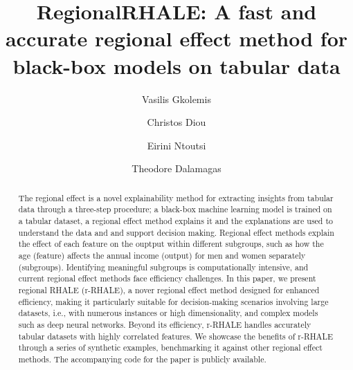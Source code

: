 \documentclass[
twocolumn,
]{ceurart}
\begin{document}


\title{RegionalRHALE: A fast and accurate regional effect method for black-box models on tabular data}

\author[1,2]{Vasilis Gkolemis}
\address[1]{Harokopio University of Athens}
\address[2]{ATHENA Research Center}
\author[1]{Christos Diou}
\author[3]{Eirini Ntoutsi}
\address[3]{University of the Bundeswehr Munich}
\author[2]{Theodore Dalamagas}


\begin{abstract}
  The regional effect is a novel explainability method for extracting insights from tabular data through a three-step procedure; a black-box machine learning model is trained on a tabular dataset, a regional effect method explains it and the explanations are used to understand the data and and support decision making.
  Regional effect methods explain the effect of each feature on the ouptput within different subgroups, such as how the age (feature) affects the annual income (output) for men and women separately (subgroups). Identifying meaningful subgroups is computationally intensive, and current regional effect methods face efficiency challenges.
In this paper, we present regional RHALE (r-RHALE), a nover regional effect method designed for enhanced efficiency, making it particularly suitable for decision-making scenarios involving large datasets, i.e., with numerous instances or high dimensionality, and complex models such as deep neural networks. Beyond its efficiency, r-RHALE handles accurately tabular datasets with highly correlated features. We showcase the benefits of r-RHALE through a series of synthetic examples, benchmarking it against other regional effect methods. The accompanying code for the paper is publicly available.
\end{abstract}
\end{document}
